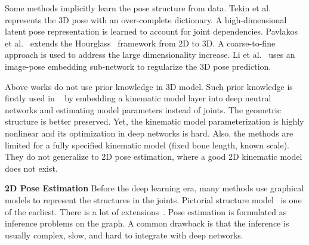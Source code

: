\documentclass[10pt,twocolumn,letterpaper]{article}
\begin{document}
Some methods implicitly learn the pose structure from data. Tekin et al.~\cite{tekin2016structured} represents the 3D pose with an over-complete dictionary. A high-dimensional latent pose representation is learned to account for joint dependencies. Pavlakos et al.~\cite{pavlakos2016coarse} extends the Hourglass~\cite{newell2016stacked} framework from 2D to 3D. A coarse-to-fine approach is used to address the large dimensionality increase. Li et al.~\cite{li2015maximum} uses an image-pose embedding sub-network to regularize the 3D pose prediction.



Above works do not use prior knowledge in 3D model. Such prior knowledge is firstly used in ~\cite{zhou2016deep,zhou2016model} by embedding a kinematic model layer into deep neutral networks and estimating model parameters instead of joints. The geometric structure is better preserved. Yet, the kinematic model parameterization is highly nonlinear and its optimization in deep networks is hard. Also, the methods are limited for a fully specified kinematic model (fixed bone length, known scale). They do not generalize to 2D pose estimation, where a good 2D kinematic model does not exist.

\begin{comment}
Moreover, in \cite{zhou2016deep} and \cite{zhou2016model}, direct optimization of the motion parameter loss gets high joint location error so that they implement a kinematic layer to optimize motion output with joint location loss. However, it's hard for them to combine both losses which are in totally different measurements. 
\end{comment}

\textbf{2D Pose Estimation} Before the deep learning era, many methods use graphical models to represent the structures in the joints. Pictorial structure model~\cite{felzenszwalb2005pictorial} is one of the earliest. There is a lot of extensions~\cite{johnson2011learning, yang2011articulated, pishchulin2013poselet, pedersoli2015coarse, yang2013articulated, lindner2015robust, chen2014articulated}. Pose estimation is formulated as inference problems on the graph. A common drawback is that the inference is usually complex, slow, and hard to integrate with deep networks.
\end{document}
